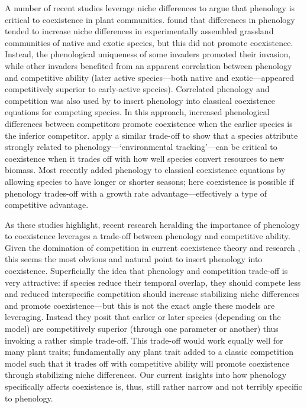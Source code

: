 \documentclass[11pt]{article}
\begin{document}
A number of recent studies leverage niche differences to argue that phenology is critical to coexistence in plant communities. \citet{godoy2014} found that differences in phenology tended to increase niche differences in experimentally assembled grassland communities of native and exotic species, but this did not promote coexistence. Instead, the phenological uniqueness of some invaders promoted their invasion, while other invaders benefited from an apparent correlation between phenology and competitive ability (later active species---both native and exotic---appeared competitively superior to early-active species). Correlated phenology and competition was also used by \citet{rudolf2019role} to insert phenology into classical coexistence equations for competing species. In this approach, increased phenological differences between competitors promote coexistence when the earlier species is the inferior competitor. \citet{wolkovich2021phenological} apply a similar trade-off to show that a species attribute strongly related to phenology---`environmental tracking'---can be critical to coexistence when it trades off with how well species convert resources to new biomass. Most recently \citet{levine2022competition} added phenology to classical coexistence equations by allowing species to have longer or shorter seasons; here coexistence is possible if phenology trades-off with a growth rate advantage---effectively a type of competitive advantage.  

As these studies highlight, recent research heralding the importance of phenology to coexistence leverages a trade-off between phenology and competitive ability. Given the domination of competition in current coexistence theory and research \citep{mcpeek2022coexistence}, this seems the most obvious and natural point to insert phenology into coexistence. Superficially the idea that phenology and competition trade-off is very attractive: if species reduce their temporal overlap, they should compete less and reduced interspecific competition should increase stabilizing niche differences and promote coexistence---but this is not the exact angle these models are leveraging. Instead they posit that earlier or later species (depending on the model) are competitively superior (through one parameter or another) thus invoking a rather simple trade-off. This trade-off would work equally well for many plant traits; fundamentally any plant trait added to a classic competition model such that it trades off with competitive ability will promote coexistence through stabilizing niche differences. Our current insights into how phenology specifically affects coexistence is, thus, still rather narrow and not terribly specific to phenology. 
\end{document}
